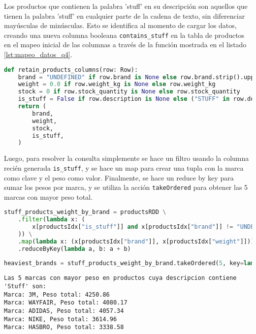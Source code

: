 Los productos que contienen la palabra 'stuff' en su descripción son aquellos que tienen la palabra 'stuff' en cualquier parte de la cadena de texto, sin diferenciar mayúsculas de minúsculas. Esto se identifica al momento de cargar los datos, creando una nueva columna booleana \texttt{contains\_stuff} en la tabla de productos en el mapeo inicial de las columnas a través de la función mostrada en el listado \ref{lst:mapeo_datos_q4}.

\begin{lstlisting}[language=Python, caption=Mapeo de columnas inicial para la consulta 4, label={lst:mapeo_datos_q4}, xleftmargin=5pt, xrightmargin=5pt]
def retain_products_columns(row: Row):
    brand = "UNDEFINED" if row.brand is None else row.brand.strip().upper()
    weight = 0.0 if row.weight_kg is None else row.weight_kg
    stock = 0 if row.stock_quantity is None else row.stock_quantity
    is_stuff = False if row.description is None else ("STUFF" in row.description.upper())
    return (
        brand,
        weight,
        stock,
        is_stuff,
    )
\end{lstlisting}

Luego, para resolver la consulta simplemente se hace un filtro usando la columna recién generada \texttt{is\_stuff}, y se hace un map para crear una tupla con la marca como clave y el peso como valor. Finalmente, se hace un reduce by key para sumar los pesos por marca, y se utiliza la acción \texttt{takeOrdered} para obtener las 5 marcas con mayor peso total.

\begin{lstlisting}[language=Python, caption=Resolución de la consulta 4 propuesta por el enunciado, label={lst:enunciado_q4}, xleftmargin=20pt, xrightmargin=20pt]
stuff_products_weight_by_brand = productsRDD \
    .filter(lambda x: (
        x[productsIdx["is_stuff"]] and x[productsIdx["brand"]] != "UNDEFINED"
    )) \
    .map(lambda x: (x[productsIdx["brand"]], x[productsIdx["weight"]])) \
    .reduceByKey(lambda a, b: a + b)
    
heaviest_brands = stuff_products_weight_by_brand.takeOrdered(5, key=lambda x: -x[1])
\end{lstlisting}

\begin{lstlisting}[style=console, caption=Resultados de la consulta 4 propuesta por el enunciado, label={lst:enunciado_q4_results}, xleftmargin=30pt, xrightmargin=30pt]
Las 5 marcas con mayor peso en productos cuya descripcion contiene 'Stuff' son:
Marca: 3M, Peso total: 4250.86
Marca: WAYFAIR, Peso total: 4080.17
Marca: ADIDAS, Peso total: 4057.34
Marca: NIKE, Peso total: 3614.96
Marca: HASBRO, Peso total: 3338.58
\end{lstlisting}

